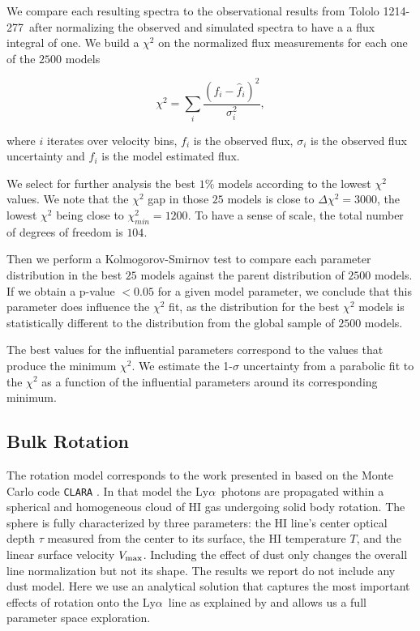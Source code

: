 \documentclass[a4,useAMS,usenatbib,usegraphicx]{mn2e}
\newcommand{\tol}{Tololo 1214-277}
\newcommand{\lya}{Ly$\alpha$}
\begin{document}
We compare each resulting spectra to the observational results from
\tol\ after normalizing the observed and simulated spectra to have a a
flux integral of one.
We build a $\chi^2$ on the normalized flux measurements for each one
of the $2500$ models

\begin{equation}
\chi^2 = \sum_{i} \frac{({f}_i - \hat{f}_i)^2}{\sigma_i^2}, 
\label{eq:chi2}
\end{equation}

where $i$ iterates over velocity bins, $f_{i}$ is the observed flux,
$\sigma_i$ is the observed flux uncertainty and $\hat{f}_i$ is the
model estimated flux.
 
We select for further analysis the best $1\%$ models according to the
lowest $\chi^2$ values.
We note that the $\chi^2$ gap in those $25$ models is close to
$\Delta\chi^2 = 3000$, the lowest $\chi^2$ being close to
$\chi^2_{min}=1200$.
To have a sense of scale, the total number of degrees of freedom is
$104$. 

Then we perform a Kolmogorov-Smirnov test to compare each parameter
distribution in the best $25$ models against the parent distribution
of $2500$ models. 
If we obtain a p-value $<0.05$ for a given model parameter, we conclude that
this parameter does influence the $\chi^2$ fit, as the distribution for
the best $\chi^2$ models is statistically different to the
distribution from the global sample of $2500$ models.  

The best values for the influential parameters correspond to
the values that produce the minimum
$\chi^2$.
We estimate the 1-$\sigma$ uncertainty from a parabolic fit to the
$\chi^2$ as a function of the influential parameters around its
corresponding minimum.   



\subsection{Bulk Rotation}

The rotation model corresponds to the work presented in
\citep{GaravitoCamargo2014} based on the Monte Carlo code
\texttt{CLARA} \citep{CLARA}. 
In that model the \lya\ photons are propagated 
within a spherical and homogeneous cloud of HI gas undergoing solid
body rotation.
The sphere is fully characterized by three parameters: the HI line's
center optical  depth $\tau$ measured from the center to its surface, the HI
temperature $T$, and the linear surface velocity $V_{\rm max}$.  
Including the effect of dust only changes the overall line
normalization but not its shape.  
The results we report do not include any dust model.
Here we use an analytical solution that captures the most important
effects of rotation onto the \lya\ line as explained by
\citet{GaravitoCamargo2014} and allows us a full parameter space
exploration.  
\end{document}
